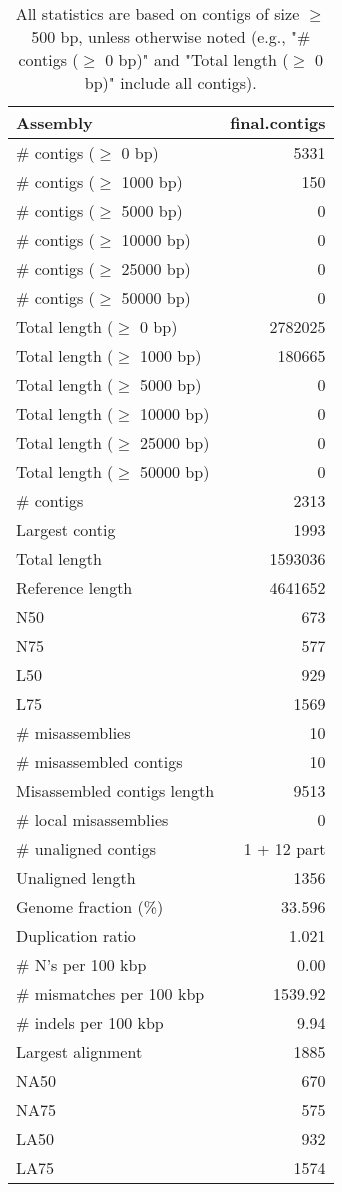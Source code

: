 \documentclass[12pt,a4paper]{article}
\begin{document}
\begin{table}[ht]
\begin{center}
\caption{All statistics are based on contigs of size $\geq$ 500 bp, unless otherwise noted (e.g., "\# contigs ($\geq$ 0 bp)" and "Total length ($\geq$ 0 bp)" include all contigs).}
\begin{tabular}{|l*{1}{|r}|}
\hline
Assembly & final.contigs \\ \hline
\# contigs ($\geq$ 0 bp) & 5331 \\ \hline
\# contigs ($\geq$ 1000 bp) & 150 \\ \hline
\# contigs ($\geq$ 5000 bp) & 0 \\ \hline
\# contigs ($\geq$ 10000 bp) & 0 \\ \hline
\# contigs ($\geq$ 25000 bp) & 0 \\ \hline
\# contigs ($\geq$ 50000 bp) & 0 \\ \hline
Total length ($\geq$ 0 bp) & 2782025 \\ \hline
Total length ($\geq$ 1000 bp) & 180665 \\ \hline
Total length ($\geq$ 5000 bp) & 0 \\ \hline
Total length ($\geq$ 10000 bp) & 0 \\ \hline
Total length ($\geq$ 25000 bp) & 0 \\ \hline
Total length ($\geq$ 50000 bp) & 0 \\ \hline
\# contigs & 2313 \\ \hline
Largest contig & 1993 \\ \hline
Total length & 1593036 \\ \hline
Reference length & 4641652 \\ \hline
N50 & 673 \\ \hline
N75 & 577 \\ \hline
L50 & 929 \\ \hline
L75 & 1569 \\ \hline
\# misassemblies & 10 \\ \hline
\# misassembled contigs & 10 \\ \hline
Misassembled contigs length & 9513 \\ \hline
\# local misassemblies & 0 \\ \hline
\# unaligned contigs & 1 + 12 part \\ \hline
Unaligned length & 1356 \\ \hline
Genome fraction (\%) & 33.596 \\ \hline
Duplication ratio & 1.021 \\ \hline
\# N's per 100 kbp & 0.00 \\ \hline
\# mismatches per 100 kbp & 1539.92 \\ \hline
\# indels per 100 kbp & 9.94 \\ \hline
Largest alignment & 1885 \\ \hline
NA50 & 670 \\ \hline
NA75 & 575 \\ \hline
LA50 & 932 \\ \hline
LA75 & 1574 \\ \hline
\end{tabular}
\end{center}
\end{table}
\end{document}
